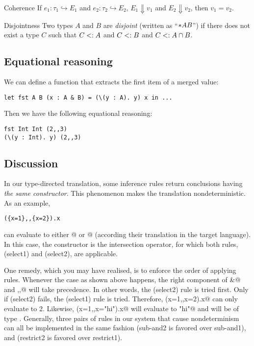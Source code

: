 \documentclass[nocopyrightspace,preprint,times,9pt]{sigplanconf}
\begin{document}
\begin{definition}{Coherence}
If $e_1 : \tau_1 \hookrightarrow E_1$ and $e_2 : \tau_2 \hookrightarrow E_2$,
$E_1 \Downarrow v_1$ and $E_2 \Downarrow v_2$,
then $v_1 = v_2$.
\end{definition}

\begin{definition}{Disjointness}
Two types $A$ and $B$ are \emph{disjoint} (written as ``$* A B$'') if there does not exist a type $C$ such that $C <: A$ and $C <: B$ and $C <: A \cap B$.
\end{definition}

\subsection{Equational reasoning}

We can define a  function that extracts the first item of a merged value:
\begin{lstlisting}
let fst A B (x : A & B) = (\(y : A). y) x in ...
\end{lstlisting}
Then we have the following equational reasoning:
\begin{lstlisting}
fst Int Int (2,,3)
(\(y : Int). y) (2,,3)
\end{lstlisting}

\subsection{Discussion}

In our type-directed translation, some inference rules return conclusions having
\emph{the same constructor}. This phenomenon makes the translation
nondeterministic. As an example,

\begin{lstlisting}
({x=1},,{x=2}).x
\end{lstlisting}

can evaluate to either @ or @ (according their
translation in the target language). In this case, the constructor is the
intersection operator, for which both rules, (select1) and (select2), are
applicable.

One remedy, which you may have realised, is to enforce the order of applying
rules. Whenever the case as shown above happens, the right component of
\lstinline@&@ and \lstinline@,,@ will take precedence. In other words, the
(select2) rule is tried first. Only if (select2) fails, the (select1) rule is
tried. Therefore, \lstinline@({x=1},,{x=2}).x@ can only evaluate to 2. Likewise,
\lstinline@({x=1},,{x="hi"}).x@ will evaluate to \lstinline@"hi"@ and will be of
type \lstinline@String@. Generally, three pairs of rules in our system that
cause nondeterminism can all be implemented in the same fashion (sub-and2 is
favored over sub-and1), and (restrict2 is favored over restrict1).
\end{document}
